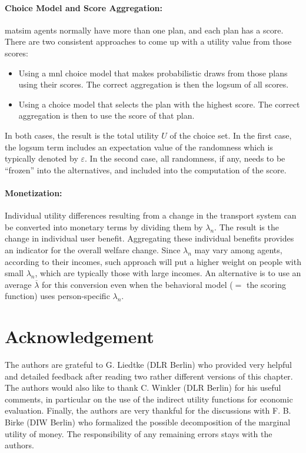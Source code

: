 \paragraph*{Choice Model and Score Aggregation:}

\gls{matsim} agents normally have more than one plan, and each plan has a score.  There are two consistent approaches to come up with a utility value from those scores:
\begin{itemize}\styleItemize

\item Using a \gls{mnl} choice model that makes probabilistic draws from those plans using their scores. The correct aggregation is then the logsum of all scores.

\item Using a choice model that selects the plan with the highest score. The correct aggregation is then to use the score of that plan.

\end{itemize}
In both cases, the result is the total utility $U$ of the choice set.  In the first case, the logsum term includes an expectation value of the randomness which is typically denoted by $\varepsilon$.  In the second case, all randomness, if any, needs to be ``frozen'' into the alternatives, and included into the computation of the score.

\paragraph*{Monetization:}

Individual utility differences resulting from a change in the transport system can be converted into monetary terms by dividing them by $\lambda_n$. The result is the change in individual user benefit. Aggregating these individual benefits provides an indicator for the overall welfare change.
%
Since $\lambda_n$ may vary among agents, \eg according to their incomes, such approach will put a higher weight on people with small $\lambda_n$, which are typically those with large incomes.  An alternative is to use an average $\overline\lambda$ for this conversion even when the behavioral model ($=$ the scoring function) uses person-specific $\lambda_n$.

\section*{Acknowledgement}
The authors are grateful to G. Liedtke (DLR Berlin) who provided very helpful and detailed feedback after reading two rather different versions of this chapter.
%
The authors would also like to thank C. Winkler (DLR Berlin) for his useful comments, in particular on the use of the indirect utility functions for economic evaluation.
%
Finally, the authors are very thankful for the discussions with F. B. Birke (DIW Berlin) who formalized the possible decomposition of the marginal utility of money.
%
The responsibility of any remaining errors stays with the authors.


